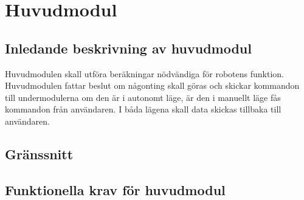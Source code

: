 \section{Huvudmodul}

\subsection{Inledande beskrivning av huvudmodul}
Huvudmodulen skall utföra beräkningar nödvändiga för robotens funktion. Huvudmodulen fattar beslut om någonting skall göras och skickar kommandon till undermodulerna om den är i autonomt läge, är den i manuellt läge fås kommandon från användaren. I båda lägena skall data skickas tillbaka till användaren.

\subsection{Gränssnitt}
\begin{LIPSkravlista}
\end{LIPSkravlista}

\subsection{Funktionella krav för huvudmodul}	
\begin{LIPSkravlista}
\end{LIPSkravlista}
